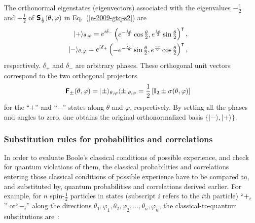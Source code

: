 The  orthonormal eigenstates (eigenvectors)  associated with the eigenvalues $-\frac{1}{2}$ and $+\frac{1}{2}$ of
$\textsf{\textbf{S}}_\frac{1}{2}(\theta , \varphi )$ in Eq.~(\ref{e-2009-gtq-s2})
are
\begin{equation}
\label{e-2009-gtq-s2ev}
\begin{split}
\vert +\rangle_{\theta ,\varphi}
=e^{i\delta_{-}} \begin{pmatrix}
e^{-\frac{i\varphi}{2}} \cos{\theta \over 2}, e^{\frac{i\varphi}{2}}\sin{\theta \over 2}
\end{pmatrix}^\intercal ,   \\
\vert -\rangle_{\theta ,\varphi}
=e^{i\delta_{+}}  \begin{pmatrix} -
e^{-\frac{i\varphi}{2}} \sin{\theta \over 2} ,e^{\frac{i\varphi}{2}}  \cos{\theta \over 2}
\end{pmatrix}^\intercal ,
\end{split}
\end{equation}
respectively. $\delta_{+}$ and $\delta_{-}$ are arbitrary phases.
These orthogonal unit vectors correspond to the two orthogonal projectors
\begin{equation}
\label{e-2009-gtq-s2evproj}
\textsf{\textbf{F}}_\pm (\theta ,\varphi ) =  \vert \pm \rangle_{\theta ,\varphi} \langle  \pm \vert_{\theta ,\varphi}
=
\frac{1}{2}
\left[
{\Bbb I}_2 \pm \sigma (\theta ,\varphi)
\right]
\end{equation}
for the ``$+$''   and ``$-$'' states along $\theta $ and $\varphi$, respectively.
By setting all the phases and angles to zero, one obtains the original
orthonormalized basis $\{\vert -\rangle,\vert +\rangle\}$.

\subsubsection{Substitution rules for probabilities and correlations}

In order to evaluate Boole's
classical conditions of possible
experience, and check for quantum violations of them,
the classical probabilities and correlations entering those classical conditions of possible
experience
have to be compared to, and substituted by,
quantum probabilities and correlations derived earlier.
For example, for $n$ spin-$\frac{1}{2}$ particles
in states (subscript $i$ refers to the $i$th particle) ``$+_i$'' or``$-_i$'' along the  directions
$\theta_{1},\varphi_{1} , \theta_{2},\varphi_{2} , \ldots ,\theta_n,\varphi_n$,
the classical-to-quantum substitutions are~\cite{filipp-svo-04-qpoly-prl,schimpf-svozil,svozil-2009-bogoliubov09-b}:

